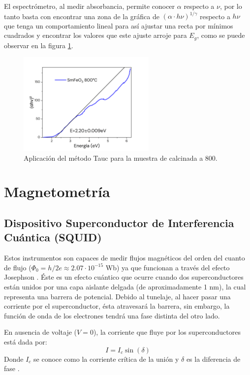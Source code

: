 \documentclass[../main.tex]{subfiles}
\begin{document}
El espectrómetro, al medir absorbancia, permite conocer $\alpha$ respecto a $\nu$, por lo tanto basta con encontrar una zona de la gráfica de $(\alpha\cdot h\nu)^{1/\gamma}$ respecto a $h\nu$ que tenga un comportamiento lineal para así ajustar una recta por mínimos cuadrados y encontrar los valores que este ajuste arroje para $E_g$, como se puede observar en la figura \ref{fig:ejemplotauc}.
\begin{figure}[H]
    \centering
    \includegraphics[width=0.6\textwidth]{fig/ejemplotauc.png}
    \caption{Aplicación del método Tauc para la muestra de \sama{} calcinada a 800\gradoC.}
    \label{fig:ejemplotauc}
\end{figure}
\section{Magnetometría}
\subsection{Dispositivo Superconductor de Interferencia Cuántica (SQUID)}
Estos instrumentos son capaces de medir flujos magnéticos del orden del cuanto de flujo ($\Phi_0=h/2e\approx2.07\cdot10^{-15}$ Wb) ya que funcionan a través del efecto Josephson \cite{Pekola2003}. Éste es un efecto cuántico que ocurre cuando dos superconductores están unidos por una capa aislante delgada (de aproximadamente 1 nm), la cual representa una barrera de potencial. Debido al tunelaje, al hacer pasar una corriente por el superconductor, ésta atravesará la barrera, sin embargo, la función de onda de los electrones tendrá una fase distinta del otro lado.

En ausencia de voltaje ($V=0$), la corriente que fluye por los superconductores está dada por:
\begin{equation}
    I=I_c\sin(\delta)
    \label{eq:corrientecritica}
\end{equation}
Donde $I_c$ se conoce como la corriente crítica de la unión y $\delta$ es la diferencia de fase \cite{Kirtley1999}.
\end{document}
